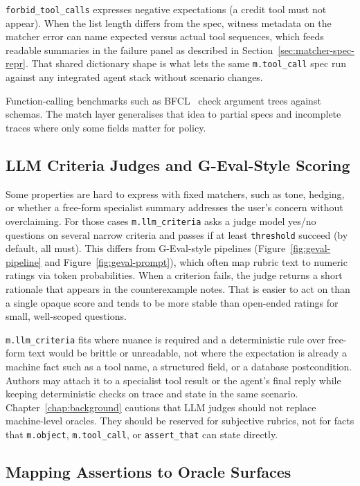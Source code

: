 \texttt{forbid\_tool\_calls} expresses negative expectations (a credit tool must not appear). When the list length differs from the spec, witness metadata on the matcher error can name expected versus actual tool sequences, which feeds readable summaries in the failure panel as described in Section~\ref{sec:matcher-spec-repr}. That shared dictionary shape is what lets the same \texttt{m.tool\_call} spec run against any integrated agent stack without scenario changes.

Function-calling benchmarks such as BFCL~\citep{patil2025bfcl} check argument trees against schemas. The match layer generalises that idea to partial specs and incomplete traces where only some fields matter for policy.

\subsection{LLM Criteria Judges and G-Eval-Style Scoring}

Some properties are hard to express with fixed matchers, such as tone, hedging, or whether a free-form specialist summary addresses the user's concern without overclaiming. For those cases \texttt{m.llm\_criteria} asks a judge model yes/no questions on several narrow criteria and passes if at least \texttt{threshold} succeed (by default, all must). This differs from G-Eval-style pipelines (Figure~\ref{fig:geval-pipeline} and Figure~\ref{fig:geval-prompt}), which often map rubric text to numeric ratings via token probabilities. When a criterion fails, the judge returns a short rationale that appears in the counterexample notes. That is easier to act on than a single opaque score and tends to be more stable than open-ended ratings for small, well-scoped questions.

\texttt{m.llm\_criteria} fits where nuance is required and a deterministic rule over free-form text would be brittle or unreadable, not where the expectation is already a machine fact such as a tool name, a structured field, or a database postcondition. Authors may attach it to a specialist tool result or the agent's final reply while keeping deterministic checks on trace and state in the same scenario. Chapter~\ref{chap:background} cautions that LLM judges should not replace machine-level oracles. They should be reserved for subjective rubrics, not for facts that \texttt{m.object}, \texttt{m.tool\_call}, or \texttt{assert\_that} can state directly.

\subsection{Mapping Assertions to Oracle Surfaces}

